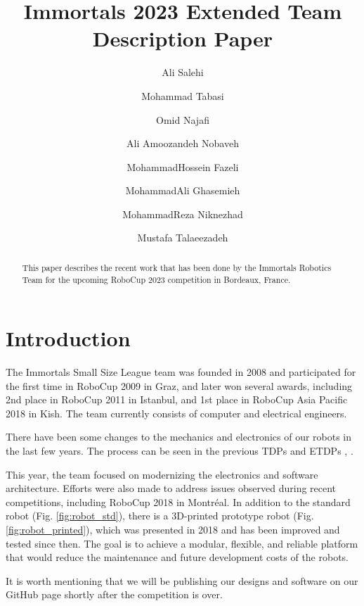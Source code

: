 \documentclass[runningheads]{llncs}
\begin{document}
%
\title{Immortals 2023 Extended Team Description Paper}

\author{Ali Salehi \and
Mohammad Tabasi \and
Omid Najafi \and
Ali Amoozandeh Nobaveh \and
MohammadHossein Fazeli \and
MohammadAli Ghasemieh \and
MohammadReza Niknezhad \and
Mustafa Talaeezadeh}
%
%
%
\maketitle              %
%
\begin{abstract}
This paper describes the recent work that has been done by the Immortals Robotics Team for the upcoming RoboCup 2023 competition in Bordeaux, France.

\end{abstract}

\section{Introduction}
The Immortals Small Size League team was founded in 2008 and participated for the first time in RoboCup 2009 in Graz, and later won several awards, including 2nd place in RoboCup 2011 in Istanbul, and 1st place in RoboCup Asia Pacific 2018 in Kish. The team currently consists of computer and electrical engineers.

There have been some changes to the mechanics and electronics of our robots in the last few years. The process can be seen in the previous TDPs and ETDPs \cite{ref_ETDP2019}, \cite{ref_ETDP2020}.
 
This year, the team focused on modernizing the electronics and software architecture. Efforts were also made to address issues observed during recent competitions, including RoboCup 2018 in Montréal. In addition to the standard robot (Fig. \ref{fig:robot_std}), there is a 3D-printed prototype robot (Fig. \ref{fig:robot_printed}), which was presented in 2018 and has been improved and tested since then. The goal is to achieve a modular, flexible, and reliable platform that would reduce the maintenance and future development costs of the robots.

It is worth mentioning that we will be publishing our designs and software on our GitHub page \cite{ref_github} shortly after the competition is over.
\end{document}
